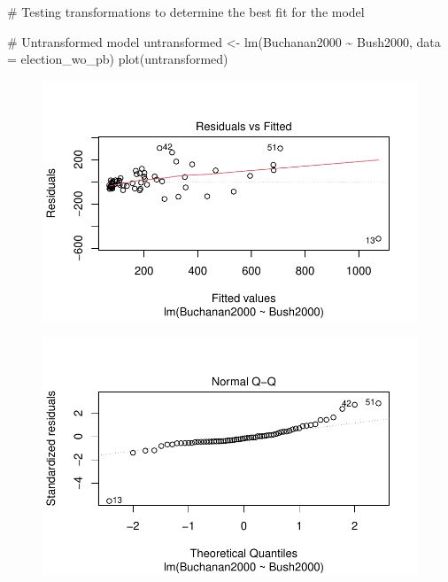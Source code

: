 \documentclass[
  letterpaper,
  DIV=11,
  numbers=noendperiod]{scrartcl}
\newenvironment{Shaded}{\begin{snugshade}}{\end{snugshade}}
\newcommand{\AttributeTok}[1]{\textcolor[rgb]{0.40,0.45,0.13}{#1}}
\newcommand{\CommentTok}[1]{\textcolor[rgb]{0.37,0.37,0.37}{#1}}
\newcommand{\FunctionTok}[1]{\textcolor[rgb]{0.28,0.35,0.67}{#1}}
\newcommand{\NormalTok}[1]{\textcolor[rgb]{0.00,0.23,0.31}{#1}}
\newcommand{\OtherTok}[1]{\textcolor[rgb]{0.00,0.23,0.31}{#1}}
\newcommand{\SpecialCharTok}[1]{\textcolor[rgb]{0.37,0.37,0.37}{#1}}
\begin{document}
\begin{Shaded}
\begin{Highlighting}[]
\CommentTok{\# Testing transformations to determine the best fit for the model}

\CommentTok{\# Untransformed model}
\NormalTok{untransformed }\OtherTok{\textless{}{-}} \FunctionTok{lm}\NormalTok{(Buchanan2000 }\SpecialCharTok{\textasciitilde{}}\NormalTok{ Bush2000, }\AttributeTok{data =}\NormalTok{ election\_wo\_pb)}
\FunctionTok{plot}\NormalTok{(untransformed)}
\end{Highlighting}
\end{Shaded}

\begin{figure}[H]

{\centering \includegraphics{case_study_1_files/figure-pdf/unnamed-chunk-4-3.pdf}

}

\end{figure}

\begin{figure}[H]

{\centering \includegraphics{case_study_1_files/figure-pdf/unnamed-chunk-4-4.pdf}

}

\end{figure}
\end{document}
